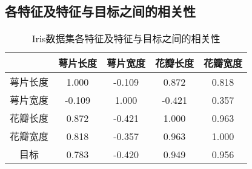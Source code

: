 \documentclass[12pt,a4paper]{article}
\theoremstyle{definition}
\begin{document}
\subsection{各特征及特征与目标之间的相关性}

\begin{table}[H]
	\renewcommand\arraystretch{1.35}
	\caption{Iris数据集各特征及特征与目标之间的相关性}
	\label{tab:iris_co}
	\centering
	
	\begin{tabular}{c|cccc}
		\centering
		 & 萼片长度 & 萼片宽度 & 花瓣长度 & 花瓣宽度 \\
		\hline
		萼片长度 & 1.000 & -0.109 & 0.872 & 0.818 \\
		萼片宽度 & -0.109 & 1.000 & -0.421 & 0.357 \\
		花瓣长度 & 0.872 & -0.421 & 1.000 & 0.963 \\
		花瓣宽度 & 0.818 & -0.357 & 0.963 & 1.000 \\
		目标 & 0.783 & -0.420 & 0.949 & 0.956 \\
	\end{tabular}
\end{table}
\end{document}

